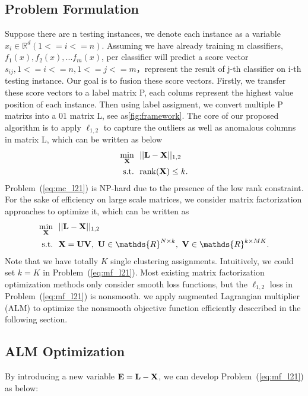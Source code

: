 \documentclass[letterpaper]{article}
\def\bE{{\bf E}}
\def\bL{{\bf L}}
\def\bU{{\bf U}}
\def\bV{{\bf V}}
\def\dsR{\mathds{R}}
\def\bX{{\bf X}}
\def\bX{{\bf X}}
\def\st{{\text{s.t.}}}
\def\rank{{\text{rank}}}
\begin{document}
\subsection{Problem Formulation}{}
Suppose there are n testing instances, we denote each instance as a variable $x_i \in \dsR^d (1<=i<=n)$. Assuming we have already training m classifiers, $f_1(x), f_2(x), ... f_m(x)$, per classifier will predict a score vector $s_{ij}, 1<=i<=n, 1<=j<=m$，represent the result of j-th classifier on i-th testing instance. Our goal is to fusion these score vectors. Firstly, we transfer these score vectors to a label matrix P, each colums represent the highest value position of each instance. Then using label assigment, we convert multiple P matrixs into a 01 matrix L, see as{\ref{fig:framework}}.
The core of our proposed algorithm is to apply $\ell_{1,2}$ to capture the outliers as well as anomalous columns in matrix L, which can be written as below
\begin{align}\label{eq:l12e}
  \min_{\bX} ~&~ || \bL - \bX ||_{1,2}    \nonumber \\
  \st        ~&~ \rank(\bX) \leq k  .
\end{align}
Problem~(\ref{eq:mc_l21}) is NP-hard due to the presence of the low rank constraint.
For the sake of efficiency on large scale matrices, we consider matrix factorization approaches to optimize it, which can be written as
\begin{align}\label{eq:mf_l21}
  \min_{\bX} ~&~ || \bL - \bX ||_{1,2}    \nonumber \\
  \st        ~&~ \bX = \bU \bV,~\bU \in \dsR^{N \times k},~\bV \in \dsR^{k \times MK} .
\end{align}
\noindent
Note that we have totally $K$ single clustering assignments.
Intuitively, we could set $k = K$ in Problem~(\ref{eq:mf_l21}).
Most existing matrix factorization optimization methods only consider smooth loss functions,
but the $\ell_{1,2}$ loss in Problem~(\ref{eq:mf_l21}) is nonsmooth.
we apply augmented Lagrangian multiplier (ALM) to optimize the nonsmooth objective function efficiently desccribed in the following section.

\subsection{ALM Optimization}

By introducing a new variable $\bE = \bL - \bX$, we can develop Problem~(\ref{eq:mf_l21}) as below:
\end{document}
